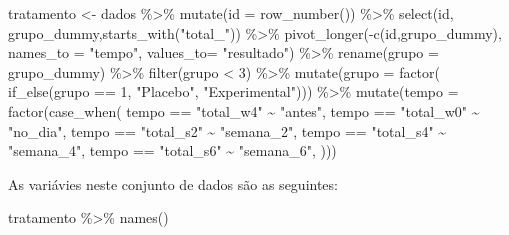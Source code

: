 \documentclass[
]{book}
\newenvironment{Shaded}{\begin{snugshade}}{\end{snugshade}}
\newcommand{\AttributeTok}[1]{\textcolor[rgb]{0.77,0.63,0.00}{#1}}
\newcommand{\DecValTok}[1]{\textcolor[rgb]{0.00,0.00,0.81}{#1}}
\newcommand{\FunctionTok}[1]{\textcolor[rgb]{0.00,0.00,0.00}{#1}}
\newcommand{\NormalTok}[1]{#1}
\newcommand{\OtherTok}[1]{\textcolor[rgb]{0.56,0.35,0.01}{#1}}
\newcommand{\SpecialCharTok}[1]{\textcolor[rgb]{0.00,0.00,0.00}{#1}}
\newcommand{\StringTok}[1]{\textcolor[rgb]{0.31,0.60,0.02}{#1}}
\begin{document}
\begin{Shaded}
\begin{Highlighting}[]
\NormalTok{tratamento }\OtherTok{\textless{}{-}}\NormalTok{ dados }\SpecialCharTok{\%\textgreater{}\%} 
  \FunctionTok{mutate}\NormalTok{(}\AttributeTok{id =} \FunctionTok{row\_number}\NormalTok{()) }\SpecialCharTok{\%\textgreater{}\%} 
  \FunctionTok{select}\NormalTok{(id, grupo\_dummy,}\FunctionTok{starts\_with}\NormalTok{(}\StringTok{"total\_"}\NormalTok{)) }\SpecialCharTok{\%\textgreater{}\%} 
  \FunctionTok{pivot\_longer}\NormalTok{(}\SpecialCharTok{{-}}\FunctionTok{c}\NormalTok{(id,grupo\_dummy),}
                \AttributeTok{names\_to =} \StringTok{"tempo"}\NormalTok{,}
               \AttributeTok{values\_to=} \StringTok{"resultado"}\NormalTok{) }\SpecialCharTok{\%\textgreater{}\%} 
  \FunctionTok{rename}\NormalTok{(}\AttributeTok{grupo =}\NormalTok{ grupo\_dummy) }\SpecialCharTok{\%\textgreater{}\%} 
  \FunctionTok{filter}\NormalTok{(grupo }\SpecialCharTok{\textless{}} \DecValTok{3}\NormalTok{) }\SpecialCharTok{\%\textgreater{}\%} 
  \FunctionTok{mutate}\NormalTok{(}\AttributeTok{grupo =} \FunctionTok{factor}\NormalTok{(}
    \FunctionTok{if\_else}\NormalTok{(grupo }\SpecialCharTok{==} \DecValTok{1}\NormalTok{, }\StringTok{"Placebo"}\NormalTok{, }\StringTok{"Experimental"}\NormalTok{))) }\SpecialCharTok{\%\textgreater{}\%} 
  \FunctionTok{mutate}\NormalTok{(}\AttributeTok{tempo =} \FunctionTok{factor}\NormalTok{(}\FunctionTok{case\_when}\NormalTok{(}
\NormalTok{    tempo }\SpecialCharTok{==} \StringTok{"total\_w4"} \SpecialCharTok{\textasciitilde{}} \StringTok{"antes"}\NormalTok{,}
\NormalTok{    tempo }\SpecialCharTok{==} \StringTok{"total\_w0"} \SpecialCharTok{\textasciitilde{}} \StringTok{"no\_dia"}\NormalTok{,}
\NormalTok{    tempo }\SpecialCharTok{==} \StringTok{"total\_s2"} \SpecialCharTok{\textasciitilde{}} \StringTok{"semana\_2"}\NormalTok{,}
\NormalTok{    tempo }\SpecialCharTok{==} \StringTok{"total\_s4"} \SpecialCharTok{\textasciitilde{}} \StringTok{"semana\_4"}\NormalTok{,}
\NormalTok{    tempo }\SpecialCharTok{==} \StringTok{"total\_s6"} \SpecialCharTok{\textasciitilde{}} \StringTok{"semana\_6"}\NormalTok{,}
\NormalTok{  )))}
\end{Highlighting}
\end{Shaded}

As variávies neste conjunto de dados são as seguintes:

\begin{Shaded}
\begin{Highlighting}[]
\NormalTok{tratamento }\SpecialCharTok{\%\textgreater{}\%} \FunctionTok{names}\NormalTok{()}
\end{Highlighting}
\end{Shaded}
\end{document}
